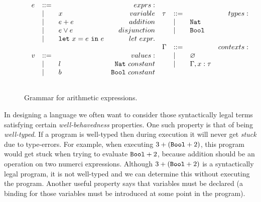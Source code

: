 \begin{figure}[h]

\[
\begin{array}{c}

\begin{array}{lllr}

e & ::= & ~ & exprs: \\
	& | & x & variable \\
	& | & e + e & addition \\
	& | & e \lor e & disjunction \\
	& | & \mathtt{let}~ x = e~\mathtt{in}~ e & let~expr. \\
	&&\\
	
v & ::= & ~ & values: \\
	& | & l & \mathtt{Nat}~constant \\
	& | & b & \mathtt{Bool}~constant \\
	&&\\

\end{array}

\begin{array}{lllr}

\tau & ::= & ~ & types: \\
	& | & \mathtt{Nat} \\
	& | & \mathtt{Bool} \\
	&&\\
	
\Gamma & ::= & ~ & contexts: \\
	& | & \varnothing \\
	& | & \Gamma, x: \tau \\
	&&\\

\end{array}

\end{array}
\]

\vspace{-7pt}
\caption{Grammar for arithmetic expressions.}
\label{A sample. }
\end{figure}

In designing a language we often want to consider those syntactically legal terms satisfying certain \textit{well-behavedness} properties. One such property is that of being \textit{well-typed}. If a program is well-typed then during execution it will never get \textit{stuck} due to type-errors. For example, when executing $3 + (\mathtt{Bool} + 2)$, this program would get stuck when trying to evaluate $\mathtt{Bool} + 2$, because addition should be an operation on two numerci expressions. Although $3 + (\mathtt{Bool} + 2)$ is a syntactically legal program, it is not well-typed and we can determine this without executing the program. Another useful property says that variables must be declared (a binding for those variables must be introduced at some point in the program).

